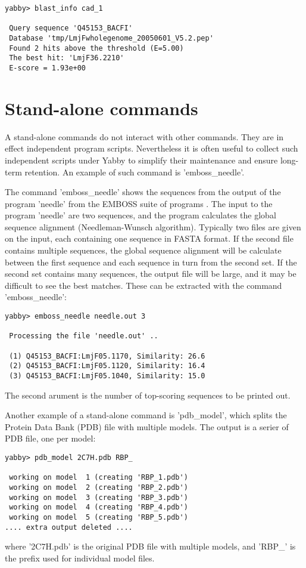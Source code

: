 \begin{verbatim}
yabby> blast_info cad_1

 Query sequence 'Q45153_BACFI'
 Database 'tmp/LmjFwholegenome_20050601_V5.2.pep'
 Found 2 hits above the threshold (E=5.00)
 The best hit: 'LmjF36.2210'
 E-score = 1.93e+00
\end{verbatim}

\section{Stand-alone commands}

A stand-alone commands do not interact with other commands. They
are in effect independent program scripts.  Nevertheless it is
often useful to collect such independent scripts under Yabby
to simplify their maintenance and ensure long-term retention.
An example of such command is 'emboss\_needle'.


The command 'emboss\_needle' shows the sequences from the output
of the program 'needle' from the EMBOSS suite of programs
\cite{emboss}. The input to the program 'needle' are two
sequences, and the program calculates the global sequence
alignment (Needleman-Wunsch algorithm). Typically two files
are given on the input, each containing one sequence in FASTA  
format. If the second file contains multiple sequences,
the global sequence alignment will be calculate between
the first sequence and each sequence in turn from the
second set. If the second set contains many sequences, the
output file will be large, and it may be difficult to see
the best matches. These can be extracted with the command
'emboss\_needle':

\begin{verbatim}
yabby> emboss_needle needle.out 3

 Processing the file 'needle.out' ..

 (1) Q45153_BACFI:LmjF05.1170, Similarity: 26.6
 (2) Q45153_BACFI:LmjF05.1120, Similarity: 16.4
 (3) Q45153_BACFI:LmjF05.1040, Similarity: 15.0
\end{verbatim}

The second arument is the number of top-scoring sequences
to be printed out.


Another example of a stand-alone command is 'pdb\_model', which 
splits the Protein Data Bank (PDB) file with multiple models.
The output is a serier of PDB file, one per model:

\begin{verbatim}
yabby> pdb_model 2C7H.pdb RBP_

 working on model  1 (creating 'RBP_1.pdb')
 working on model  2 (creating 'RBP_2.pdb')
 working on model  3 (creating 'RBP_3.pdb')
 working on model  4 (creating 'RBP_4.pdb')
 working on model  5 (creating 'RBP_5.pdb')
.... extra output deleted ....
\end{verbatim}

where '2C7H.pdb' is the original PDB file with multiple models,
and 'RBP\_' is the prefix used for individual model files.

